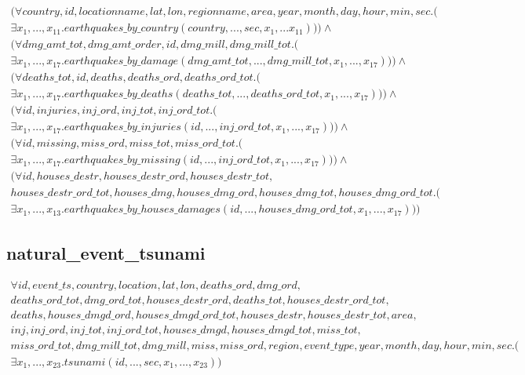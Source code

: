 \documentclass{article}
\begin{document}
\begin{multline}
(\forall country, id, locationname, lat, lon, regionname, area, year, month, day, hour, min, sec.( \\
\exists x_1,..., x_{11}. 
earthquakes\_by\_country(country, ..., sec, 
x_1,... x_{11}))) \wedge \\ (\forall dmg\_amt\_tot, dmg\_amt\_order, id, dmg\_mill, dmg\_mill\_tot.( \\
\exists x_1, ..., x_{17}. earthquakes\_by\_damage(dmg\_amt\_tot, ..., dmg\_mill\_tot, x_1, ..., x_{17}))) \wedge \\ 
(\forall deaths\_tot, id, deaths, deaths\_ord, deaths\_ord\_tot.( \\
\exists x_1, ..., x_{17}. earthquakes\_by\_deaths(deaths\_tot, ..., deaths\_ord\_tot, x_1, ..., x_{17}))) \wedge \\ 
(\forall id, injuries, inj\_ord, inj\_tot, inj\_ord\_tot.(\\
\exists x_1, ..., x_{17}. earthquakes\_by\_injuries(id, ..., inj\_ord\_tot, x_1, ..., x_{17})))
 \wedge \\ (\forall id, missing, miss\_ord, miss\_tot, miss\_ord\_tot.( \\
\exists x_1, ..., x_{17}. earthquakes\_by\_missing(id, ..., inj\_ord\_tot, x_1, ..., x_{17})))
 \wedge \\ (\forall id, houses\_destr, houses\_destr\_ord, houses\_destr\_tot, \\ houses\_destr\_ord\_tot, houses\_dmg, houses\_dmg\_ord, houses\_dmg\_tot, houses\_dmg\_ord\_tot.( \\
\exists x_1, ..., x_{13}. earthquakes\_by\_houses\_damages(id, ..., houses\_dmg\_ord\_tot, x_1, ..., x_{17})))
\end{multline} 

\subsection{natural\_event\_tsunami}
\begin{multline}
\forall id,  event\_ts,  country,  location,  lat,  lon,  deaths\_ord,  dmg\_ord,  \\ deaths\_ord\_tot,  dmg\_ord\_tot,  houses\_destr\_ord,  deaths\_tot,  houses\_destr\_ord\_tot, \\ deaths,  houses\_dmgd\_ord,  houses\_dmgd\_ord\_tot,  houses\_destr,  houses\_destr\_tot,  area, \\ inj,  inj\_ord,  inj\_tot,  inj\_ord\_tot,  houses\_dmgd,  houses\_dmgd\_tot,  miss\_tot, \\ miss\_ord\_tot,  dmg\_mill\_tot,  dmg\_mill,  miss,  miss\_ord,  region,  event\_type,  year,  month,  day,  hour,  min,  sec.( \\
\exists x_1, ..., x_{23}. tsunami(id, ..., sec, x_1, ..., x_{23}))
\end{multline} 
\end{document}
